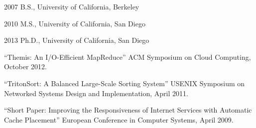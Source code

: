 \begin{vita}
\noindent
\begin{cv}{}
\begin{cvlist}{}
\item[2007] B.S., University of California, Berkeley
\item[2010] M.S., University of California, San Diego
\item[2013] Ph.D., University of California, San Diego
\end{cvlist}
\end{cv}

\publications
\noindent``Themis: An I/O-Efficient MapReduce'' ACM Symposium on Cloud
Computing, October 2012.

\noindent``TritonSort: A Balanced Large-Scale Sorting System'' USENIX Symposium
on Networked Systems Design and Implementation, April 2011.

\noindent``Short Paper: Improving the Responsiveness of Internet Services with
Automatic Cache Placement'' European Conference in Computer Systems, April 2009.

\end{vita}
